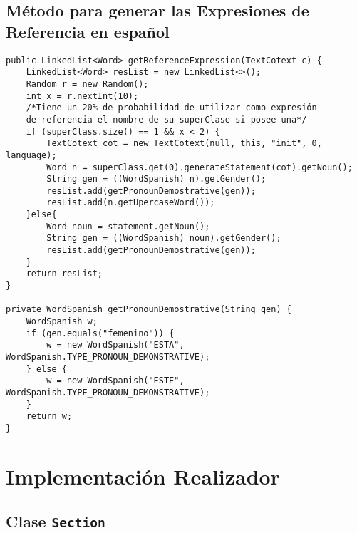 \subsection{Método para generar las Expresiones de Referencia en español}
\label{sec:met_exp_ref}

\begin{verbatim}
public LinkedList<Word> getReferenceExpression(TextCotext c) {
    LinkedList<Word> resList = new LinkedList<>();
    Random r = new Random();
    int x = r.nextInt(10);
    /*Tiene un 20% de probabilidad de utilizar como expresión
    de referencia el nombre de su superClase si posee una*/
    if (superClass.size() == 1 && x < 2) {
        TextCotext cot = new TextCotext(null, this, "init", 0, language);
        Word n = superClass.get(0).generateStatement(cot).getNoun();
        String gen = ((WordSpanish) n).getGender();
        resList.add(getPronounDemostrative(gen));
        resList.add(n.getUpercaseWord());
    }else{
        Word noun = statement.getNoun();
        String gen = ((WordSpanish) noun).getGender();
        resList.add(getPronounDemostrative(gen));
    }
    return resList;
}

private WordSpanish getPronounDemostrative(String gen) {
    WordSpanish w;
    if (gen.equals("femenino")) {
        w = new WordSpanish("ESTA", WordSpanish.TYPE_PRONOUN_DEMONSTRATIVE);
    } else {
        w = new WordSpanish("ESTE", WordSpanish.TYPE_PRONOUN_DEMONSTRATIVE);
    }
    return w;
}
\end{verbatim}

\section{Implementación Realizador}
\label{sec:impl_realizador}
\subsection{Clase \texttt{Section}}
\label{sec:clase_section}

